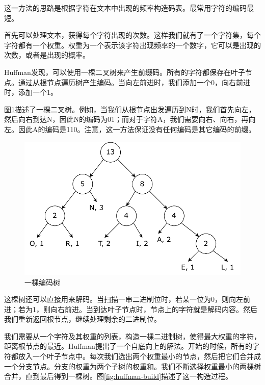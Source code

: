 \documentclass[b5paper]{ctexart}
\begin{document}
这一方法的思路是根据字符在文本中出现的频率构造码表。最常用字符的编码最短。

首先可以处理文本，获得每个字符出现的次数。这样我们就有了一个字符集，每个字符都有一个权重。权重为一个表示该字符出现频率的一个数字，它可以是出现的次数，或者是出现的概率。

Huffman发现，可以使用一棵二叉树来产生前缀码。所有的字符都保存在叶子节点。通过从根节点遍历树产生编码。当向左前进时，我们添加一个0，向右前进时，添加一个1。

图\ref{fig:huffman-tr}描述了一棵二叉树。例如，当我们从根节点出发遍历到N时，我们首先向左，然后向右到达N，因此N的编码为01；而对于字符A，我们需要向右、向右，再向左。因此A的编码是110。注意，这一方法保证没有任何编码是其它编码的前缀。

\begin{figure}[htbp]
 \centering
 \includegraphics[scale=0.5]{img/huffman-tr}
 \caption{一棵编码树}
 \label{fig:huffman-tr}
\end{figure}

这棵树还可以直接用来解码。当扫描一串二进制位时，若某一位为0，则向左前进；若为1，则向右前进。当到达叶子节点时，节点上的字符就是解码内容。然后我们重新返回根节点，继续处理剩余的二进制位。

我们需要从一个字符及其权重的列表，构造一棵二进制树，使得最大权重的字符，距离根节点的最近。Huffman提出了一个自底向上的解法。开始的时候，所有的字符都放入一个叶子节点中。每次我们选出两个权重最小的节点，然后把它们合并成一个分支节点。分支的权重为两个子树的权重和。我们不断选择权重最小的两棵树合并，直到最后得到一棵树。图\ref{fig:huffman-build}描述了这一构造过程。
\end{document}

